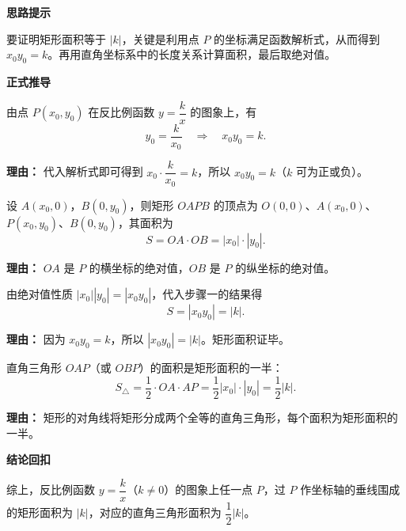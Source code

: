 \begin{proofbox}
	\textbf{\textcolor{CProof}{思路提示}}

	要证明矩形面积等于 $|k|$，关键是利用点 $P$ 的坐标满足函数解析式，从而得到 $x_0y_0=k$。再用直角坐标系中的长度关系计算面积，最后取绝对值。

	\medskip
	\textbf{\textcolor{CProof}{正式推导}}
	\begin{description}[style=nextline, leftmargin=2.8em, labelsep=0.5em, itemsep=0.55em]
		\item[\textbf{步骤一（坐标关系）：}]
		      由点 $P(x_0,y_0)$ 在反比例函数 $y=\dfrac{k}{x}$ 的图象上，有
		      \[
			      y_0=\frac{k}{x_0}\quad\Rightarrow\quad x_0y_0=k.
		      \]
		      \par\textbf{理由：} 代入解析式即可得到 $x_0\cdot \dfrac{k}{x_0}=k$，所以 $x_0y_0=k$（$k$ 可为正或负）。

		\item[\textbf{步骤二（矩形面积表达）：}]
		      设 $A(x_0,0)$，$B(0,y_0)$，则矩形 $OAPB$ 的顶点为 $O(0,0)$、$A(x_0,0)$、$P(x_0,y_0)$、$B(0,y_0)$，其面积为
		      \[
			      S=OA\cdot OB=|x_0|\cdot |y_0|.
		      \]
		      \par\textbf{理由：} $OA$ 是 $P$ 的横坐标的绝对值，$OB$ 是 $P$ 的纵坐标的绝对值。

		\item[\textbf{步骤三（矩形面积化简）：}]
		      由绝对值性质 $|x_0||y_0|=|x_0y_0|$，代入步骤一的结果得
		      \[
			      S=|x_0y_0|=|k|.
		      \]
		      \par\textbf{理由：} 因为 $x_0y_0=k$，所以 $|x_0y_0|=|k|$。矩形面积证毕。

		\item[\textbf{步骤四（三角形面积）：}]
		      直角三角形 $OAP$（或 $OBP$）的面积是矩形面积的一半：
		      \[
			      S_{\triangle}=\frac{1}{2}\cdot OA\cdot AP=\frac{1}{2}|x_0|\cdot |y_0|=\frac{1}{2}|k|.
		      \]
		      \par\textbf{理由：} 矩形的对角线将矩形分成两个全等的直角三角形，每个面积为矩形面积的一半。
	\end{description}

	\medskip
	\textbf{\textcolor{CProof}{结论回扣}}

	综上，反比例函数 $y=\dfrac{k}{x}$（$k\neq 0$）的图象上任一点 $P$，过 $P$ 作坐标轴的垂线围成的矩形面积为 $|k|$，对应的直角三角形面积为 $\dfrac{1}{2}|k|$。
\end{proofbox}